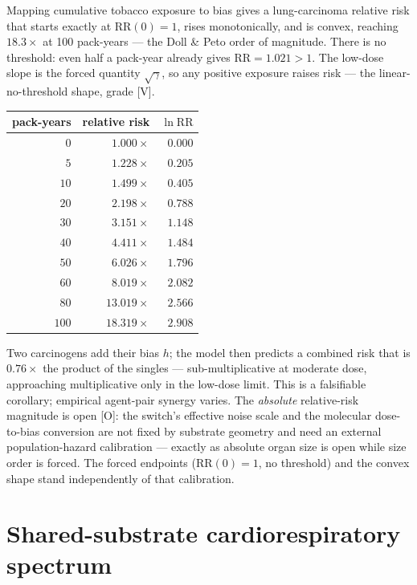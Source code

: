 \documentclass[11pt]{article}
\newcommand{\grade}[1]{\textsf{\small[#1]}}
\begin{document}
Mapping cumulative tobacco exposure to bias gives a lung-carcinoma relative risk that starts exactly at
$\mathrm{RR}(0)=1$, rises monotonically, and is convex, reaching $18.3\times$ at 100 pack-years --- the
Doll \& Peto order of magnitude. There is no threshold: even half a pack-year already gives
$\mathrm{RR}=1.021>1$. The low-dose slope is the forced quantity $\sqrt\gamma$, so any positive exposure
raises risk --- the linear-no-threshold shape, grade \grade{V}.

\begin{center}
\begin{tabular}{@{}rrr@{}}
\toprule
pack-years & relative risk & $\ln\mathrm{RR}$\\
\midrule
$0$   & $1.000\times$  & $0.000$\\
$5$   & $1.228\times$  & $0.205$\\
$10$  & $1.499\times$  & $0.405$\\
$20$  & $2.198\times$  & $0.788$\\
$30$  & $3.151\times$  & $1.148$\\
$40$  & $4.411\times$  & $1.484$\\
$50$  & $6.026\times$  & $1.796$\\
$60$  & $8.019\times$  & $2.082$\\
$80$  & $13.019\times$ & $2.566$\\
$100$ & $18.319\times$ & $2.908$\\
\bottomrule
\end{tabular}
\end{center}

\noindent
Two carcinogens add their bias $h$; the model then predicts a combined risk that is $0.76\times$ the
product of the singles --- sub-multiplicative at moderate dose, approaching multiplicative only in the
low-dose limit. This is a falsifiable corollary; empirical agent-pair synergy varies. The
\emph{absolute} relative-risk magnitude is open \grade{O}: the switch's effective noise scale and the
molecular dose-to-bias conversion are not fixed by substrate geometry and need an external
population-hazard calibration --- exactly as absolute organ size is open while size order is forced. The
forced endpoints ($\mathrm{RR}(0)=1$, no threshold) and the convex shape stand independently of that
calibration.

\section{Shared-substrate cardiorespiratory spectrum}\label{sec:spectrum}
\end{document}

